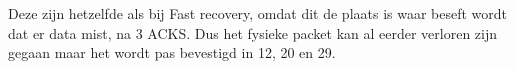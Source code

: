 Deze zijn hetzelfde als bij Fast recovery, omdat dit de plaats is waar beseft wordt dat er data mist, na 3 ACKS. Dus het fysieke packet kan al eerder verloren zijn gegaan maar het wordt pas bevestigd in 12, 20 en 29.